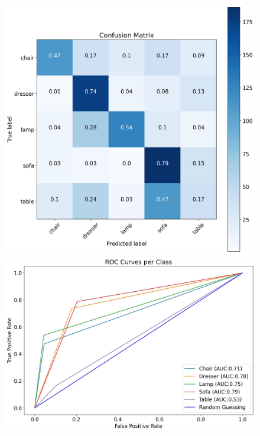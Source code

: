 \documentclass[11pt,a4paper]{article}
\begin{document}
\begin{figure}[H]
{{    \includegraphics[scale=0.13]{imgs/experiments/images/8-2/Experiment-8-2-TESTING-confusion-matrix.jpg}
    \includegraphics[scale=0.13]{imgs/experiments/images/8-2/Experiment-8-2-TESTING-ROC.jpg}
    }}
    \qquad
\end{figure}
\end{document}

